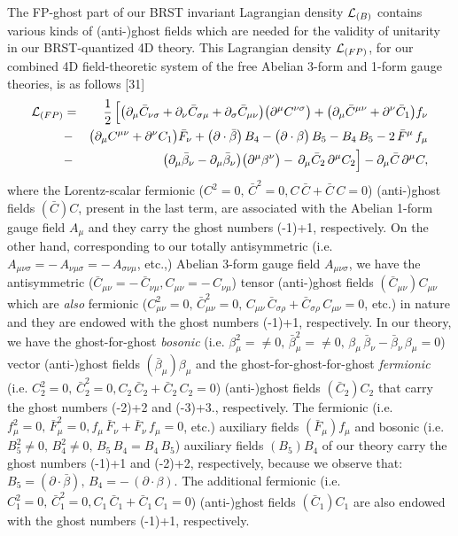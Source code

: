 \documentclass[12pt]{article}
\begin{document}
The FP-ghost part of our BRST invariant Lagrangian density ${\cal L}_{(B)}$ contains various kinds of (anti-)ghost fields 
which are needed for the validity of unitarity in our BRST-quantized 4D theory. This Lagrangian density ${\cal L}_{(FP)} $,  for our
combined 4D field-theoretic system of the free Abelian 3-form and 1-form gauge theories, is as follows [31]
\begin{eqnarray}\label{3}
{\cal L}_{(FP)}  &=&  \dfrac{1}{2}\, \Big [\big (\partial_\mu \bar C_{\nu\sigma} +  \partial_\nu \bar C_{\sigma\mu} 
+ \partial_\sigma \bar C_{\mu\nu} \big ) \big (\partial^\mu C^{\nu\sigma} \big ) +
\big (\partial_\mu \bar C^{\mu\nu}  + \partial^\nu \bar C_1 \big ) f_\nu \nonumber\\ 
&-& \big (\partial_\mu  C^{\mu\nu}  + \partial^\nu  C_1 \big ) \bar F_\nu 
 +  \big( \partial \cdot \bar \beta \big) \, B_4
 - \big( \partial \cdot  \beta \big) \, B_5 - B_4 \, B_5 - 2\, \bar F^\mu\, f_\mu \nonumber\\
&-& \big (\partial_\mu \bar \beta_\nu - \partial_\mu \bar \beta_\nu \big ) 
\big (\partial^\mu \beta^\nu \big )  
-\, \partial_\mu \bar C_2\, \partial^\mu C_2  \Big ] - \partial_\mu \bar C\, \partial^\mu C, 
\end{eqnarray}
where the Lorentz-scalar fermionic ($C^2 = 0, \, \bar C^2 = 0, C \, \bar C + \bar C \, C = 0$)
(anti-)ghost fields $(\bar C)C$, present in the last term, 
are associated with the Abelian 1-form gauge field $A_\mu$ and they carry the ghost numbers
(-1)+1, respectively. On the other hand, corresponding to our totally antisymmetric (i.e. $A_{\mu\nu\sigma} = - \,A_{\nu\mu\sigma} = -\,A_{\sigma\nu\mu}  $, etc.,)
Abelian 3-form gauge field $A_{\mu\nu\sigma} $, we have the antisymmetric
($\bar C_{\mu\nu} = -\, \bar C_{\nu\mu}, C_{\mu\nu} = -\,  C_{\nu\mu}$) tensor (anti-)ghost fields $(\bar C_{\mu\nu}) C_{\mu\nu}$ which are 
{\it also} fermionic ($C_{\mu\nu}^2 = 0, \, \bar C_{\mu\nu}^2 = 0,\, C_{\mu\nu}\, \bar C_{\sigma\rho} 
+ \bar C_{\sigma\rho}\,  C_{\mu\nu} = 0$, etc.) in nature and they are endowed 
with the ghost numbers (-1)+1, respectively. In our theory, we have 
the ghost-for-ghost {\it bosonic} (i.e. $\beta_\mu^2 = \neq 0,\, \bar \beta_\mu^2 = \neq 0, \, 
\beta_\mu \, \bar \beta_\nu - \bar \beta_\nu\, \beta_\mu = 0 $) vector (anti-)ghost fields $(\bar \beta_\mu)\beta_\mu$
and the ghost-for-ghost-for-ghost {\it fermionic} 
(i.e. $C_2^2 = 0, \, \bar C_2^2 = 0, C_2 \, \bar C_2 + \bar C_2 \, C_2 = 0 $) (anti-)ghost fields $(\bar C_2)C_2$ that carry the ghost numbers (-2)+2 and (-3)+3., respectively. The fermionic (i.e. $f_\mu^2 = 0, \, \bar F_\mu^2 = 0, f_\mu \, \bar F_\nu + \bar F_\nu \, f_\mu = 0 $, etc.)
auxiliary fields $(\bar F_\mu)f_\mu$ and bosonic (i.e. $B_5^2 \neq 0, \, B_4^2 \neq 0,\, B_5 \, B_4 = B_4 \, B_5 $)
auxiliary fields $(B_5)B_4$ of our theory carry the ghost numbers
(-1)+1 and (-2)+2, respectively, because we observe that: $B_5 = (\partial \cdot \bar \beta),\, B_4 = -\, (\partial \cdot \beta) $. 
The additional fermionic (i.e. $C_1^2 = 0, \, \bar C_1^2 = 0, C_1 \, \bar C_1 + \bar C_1 \, C_1 = 0 $)
(anti-)ghost fields $(\bar C_1)C_1$ are also endowed with the ghost numbers (-1)+1, respectively.
\end{document}
